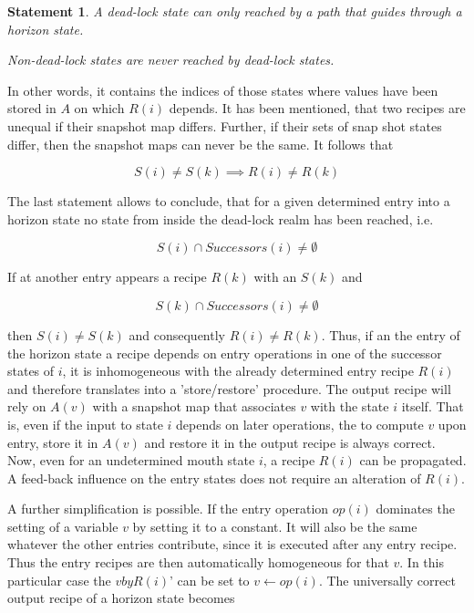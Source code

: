 \documentclass[12pt,a4paper]{scrartcl}
\theoremstyle{break}
\newtheorem{statement}{Statement}
\begin{document}
\begin{statement}
A dead-lock state can only reached by a path that guides through a horizon
state. 
   
Non-dead-lock states are never reached by dead-lock states.
\end{statement}
   
In other words, it contains the indices of those states where values have been
stored in $A$ on which $R(i)$ depends. It has been mentioned, that two recipes
are unequal if their snapshot map differs. Further, if their sets of snap shot
states differ, then the snapshot maps can never be the same. It follows that

\[
                   S(i) \neq S(k) \implies R(i) \neq R(k)
\]

The last statement allows to conclude, that for a given determined entry into a
horizon state no state from inside the dead-lock realm has been reached, i.e.

\[
              S(i) \cap Successors(i) \neq \emptyset
\]

If at another entry appears a recipe $R(k)$ with an $S(k)$ and 

\[
              S(k) \cap Successors(i) \neq \emptyset
\]

then \(S(i) \neq S(k)\) and consequently \(R(i) \neq R(k)\). Thus, if an the entry of
the horizon state a recipe depends on entry operations in one of the successor
states of $i$, it is inhomogeneous with the already determined entry recipe
$R(i)$ and therefore translates into a 'store/restore' procedure. The output
recipe will rely on $A(v)$ with a snapshot map that associates $v$ with the
state $i$ itself. That is, even if the input to state $i$ depends on later
operations, the to compute $v$ upon entry, store it in $A(v)$ and restore it in
the output recipe is always correct. Now, even for an undetermined mouth state
$i$, a recipe $R(i)$ can be propagated.  A feed-back influence on the entry
states does not require an alteration of $R(i)$.

A further simplification is possible. If the entry operation $op(i)$ dominates
the setting of a variable $v$ by setting it to a constant.  It will also be the
same whatever the other entries contribute, since it is executed after any
entry recipe. Thus the entry recipes are then automatically homogeneous for
that $v$. In this particular case the $v by R(i)$' can be set to $v \leftarrow
op(i)$.  The universally correct output recipe of a horizon state becomes 
\end{document}
